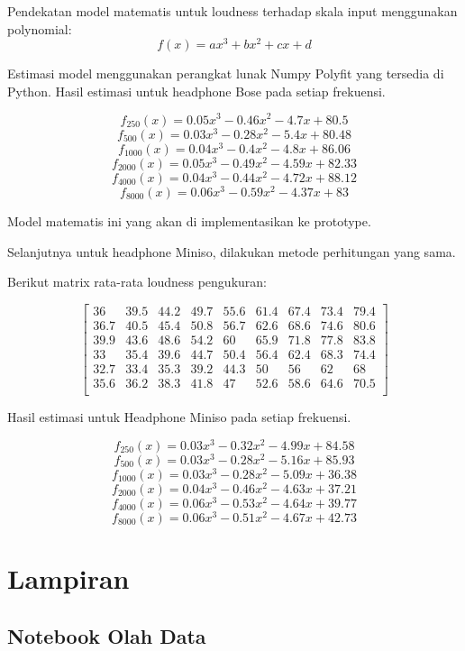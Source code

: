 \documentclass[12pt,]{article}
\begin{document}
		Pendekatan model matematis untuk loudness terhadap skala input menggunakan polynomial:\\
		\[f(x) = ax^3 + bx^2 + cx + d\]

		Estimasi model menggunakan perangkat lunak Numpy Polyfit yang tersedia di Python.
		Hasil estimasi untuk headphone Bose pada setiap frekuensi.

		\[f_{250}(x) = 0.05x^3 - 0.46x^2 - 4.7x + 80.5\]
		\[f_{500}(x) = 0.03x^3 - 0.28x^2 - 5.4x + 80.48\]
		\[f_{1000}(x) = 0.04x^3 - 0.4x^2 - 4.8x + 86.06\]
		\[f_{2000}(x) = 0.05x^3 - 0.49x^2 - 4.59x + 82.33\]
		\[f_{4000}(x) = 0.04x^3 - 0.44x^2 - 4.72x + 88.12\]
		\[f_{8000}(x) = 0.06x^3 - 0.59x^2 - 4.37x + 83\]

		Model matematis ini yang akan di implementasikan ke prototype.

		Selanjutnya untuk headphone Miniso, dilakukan metode perhitungan yang sama.

		Berikut matrix rata-rata loudness pengukuran:

		\[\left[
		\begin{matrix}
			36   & 39.5 & 44.2 & 49.7 & 55.6 & 61.4 & 67.4 & 73.4 & 79.4 \\
			36.7 & 40.5 & 45.4 & 50.8 & 56.7 & 62.6 & 68.6 & 74.6 & 80.6 \\
			39.9 & 43.6 & 48.6 & 54.2 & 60   & 65.9 & 71.8 & 77.8 & 83.8 \\
			33   & 35.4 & 39.6 & 44.7 & 50.4 & 56.4 & 62.4 & 68.3 & 74.4 \\
			32.7 & 33.4 & 35.3 & 39.2 & 44.3 & 50   & 56   & 62   & 68   \\
			35.6 & 36.2 & 38.3 & 41.8 & 47   & 52.6 & 58.6 & 64.6 & 70.5 \\
		\end{matrix}
		\right]\]

		Hasil estimasi untuk Headphone Miniso pada setiap frekuensi.

		\[f_{250}(x) = 0.03x^3 - 0.32x^2 - 4.99x + 84.58\]
		\[f_{500}(x) = 0.03x^3 - 0.28x^2 - 5.16x + 85.93\]
		\[f_{1000}(x) = 0.03x^3 - 0.28x^2 - 5.09x + 36.38\]
		\[f_{2000}(x) = 0.04x^3 - 0.46x^2 - 4.63x + 37.21\]
		\[f_{4000}(x) = 0.06x^3 - 0.53x^2 - 4.64x + 39.77\]
		\[f_{8000}(x) = 0.06x^3 - 0.51x^2 - 4.67x + 42.73\]

	\newpage
	\section{Lampiran}

	\subsection{Notebook Olah Data}
	
\end{document}
